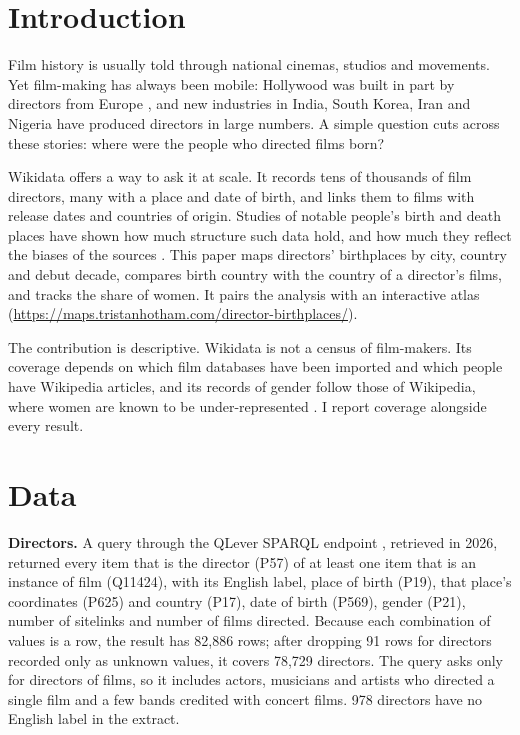 \documentclass[11pt,a4paper]{article}
\begin{document}
\section{Introduction}
Film history is usually told through national cinemas, studios and movements. Yet film-making has always been mobile: Hollywood was built in part by directors from Europe \citep{petrie}, and new industries in India, South Korea, Iran and Nigeria \citep{haynes} have produced directors in large numbers. A simple question cuts across these stories: where were the people who directed films born?

Wikidata \citep{wikidata} offers a way to ask it at scale. It records tens of thousands of film directors, many with a place and date of birth, and links them to films with release dates and countries of origin. Studies of notable people's birth and death places have shown how much structure such data hold, and how much they reflect the biases of the sources \citep{schich}. This paper maps directors' birthplaces by city, country and debut decade, compares birth country with the country of a director's films, and tracks the share of women. It pairs the analysis with an interactive atlas (\url{https://maps.tristanhotham.com/director-birthplaces/}).

The contribution is descriptive. Wikidata is not a census of film-makers. Its coverage depends on which film databases have been imported and which people have Wikipedia articles, and its records of gender follow those of Wikipedia, where women are known to be under-represented \citep{wagner}. I report coverage alongside every result.

\section{Data}
\textbf{Directors.} A query through the QLever SPARQL endpoint \citep{qlever}, retrieved in 2026, returned every item that is the director (P57) of at least one item that is an instance of film (Q11424), with its English label, place of birth (P19), that place's coordinates (P625) and country (P17), date of birth (P569), gender (P21), number of sitelinks and number of films directed. Because each combination of values is a row, the result has 82,886 rows; after dropping 91 rows for directors recorded only as unknown values, it covers 78,729 directors. The query asks only for directors of films, so it includes actors, musicians and artists who directed a single film and a few bands credited with concert films. 978 directors have no English label in the extract.
\end{document}
